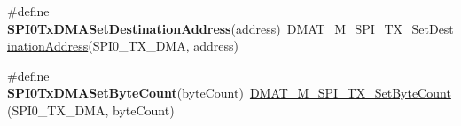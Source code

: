 \begin{DoxyCompactItemize}
\item 
\hypertarget{group___func_ala_ga9394356dc8592372ede20a3493855465}{\#define {\bfseries S\-P\-I0\-Tx\-D\-M\-A\-Set\-Destination\-Address}(address)~\hyperlink{group___d_m_a_t___m___s_p_i___t_x__module_ga1a33c0a3ee3c52e3eb70c340bdb55ead}{D\-M\-A\-T\-\_\-\-M\-\_\-\-S\-P\-I\-\_\-\-T\-X\-\_\-\-Set\-Destination\-Address}(S\-P\-I0\-\_\-\-T\-X\-\_\-\-D\-M\-A, address)}\label{group___func_ala_ga9394356dc8592372ede20a3493855465}

\item 
\hypertarget{group___func_ala_gaf578a9cbb98aca7b7c27b106d7615013}{\#define {\bfseries S\-P\-I0\-Tx\-D\-M\-A\-Set\-Byte\-Count}(byte\-Count)~\hyperlink{group___d_m_a_t___m___s_p_i___t_x__module_ga84754d3ac6e72252b68a19e95a685806}{D\-M\-A\-T\-\_\-\-M\-\_\-\-S\-P\-I\-\_\-\-T\-X\-\_\-\-Set\-Byte\-Count}(S\-P\-I0\-\_\-\-T\-X\-\_\-\-D\-M\-A, byte\-Count)}\label{group___func_ala_gaf578a9cbb98aca7b7c27b106d7615013}

\end{DoxyCompactItemize}
